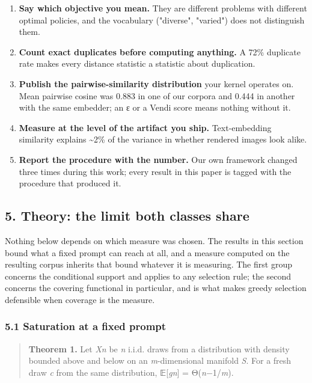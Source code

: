 \documentclass[
  10pt,
]{article}
\providecommand{\tightlist}{%
  \setlength{\itemsep}{0pt}\setlength{\parskip}{0pt}}
\theoremstyle{plain}
\theoremstyle{definition}
\providecommand{\tightlist}{\setlength{\itemsep}{0pt}\setlength{\parskip}{0pt}}
\begin{document}
\begin{enumerate}
\def\labelenumi{\arabic{enumi}.}
\tightlist
\item
  \textbf{Say which objective you mean.} They are different problems
  with different optimal policies, and the vocabulary ("diverse",
  "varied") does not distinguish them.
\item
  \textbf{Count exact duplicates before computing anything.} A 72\%
  duplicate rate makes every distance statistic a statistic about
  duplication.
\item
  \textbf{Publish the pairwise-similarity distribution} your kernel
  operates on. Mean pairwise cosine was 0.883 in one of our corpora and
  0.444 in another with the same embedder; an ε or a Vendi score means
  nothing without it.
\item
  \textbf{Measure at the level of the artifact you ship.} Text-embedding
  similarity explains \textasciitilde2\% of the variance in whether
  rendered images look alike.
\item
  \textbf{Report the procedure with the number.} Our own framework
  changed three times during this work; every result in this paper is
  tagged with the procedure that produced it.
\end{enumerate}

\subsection{5. Theory: the limit both classes
share}\label{5-theory-the-limit-both-classes-share}

Nothing below depends on which measure was chosen. The results in this
section bound what a fixed prompt can reach at all, and a measure
computed on the resulting corpus inherits that bound whatever it is
measuring. The first group concerns the conditional support and applies
to any selection rule; the second concerns the covering functional in
particular, and is what makes greedy selection defensible when coverage
is the measure.

\subsubsection{5.1 Saturation at a fixed
prompt}\label{51-saturation-at-a-fixed-prompt}

\begin{quote}
\textbf{Theorem 1.} Let \emph{Xn} be \emph{n} i.i.d. draws from a
distribution with density bounded above and below on an
\emph{m}-dimensional manifold \emph{S}. For a fresh draw \emph{c} from
the same distribution, 𝔼{[}\emph{gn}{]} = Θ(\emph{n}−1/\emph{m}).
\end{quote}
\end{document}
